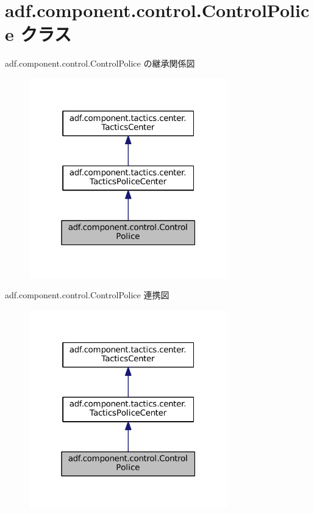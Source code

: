 \hypertarget{classadf_1_1component_1_1control_1_1ControlPolice}{}\section{adf.\+component.\+control.\+Control\+Police クラス}
\label{classadf_1_1component_1_1control_1_1ControlPolice}


adf.\+component.\+control.\+Control\+Police の継承関係図
\nopagebreak
\begin{figure}[H]
\begin{center}
\leavevmode
\includegraphics[width=244pt]{classadf_1_1component_1_1control_1_1ControlPolice__inherit__graph}
\end{center}
\end{figure}


adf.\+component.\+control.\+Control\+Police 連携図
\nopagebreak
\begin{figure}[H]
\begin{center}
\leavevmode
\includegraphics[width=244pt]{classadf_1_1component_1_1control_1_1ControlPolice__coll__graph}
\end{center}
\end{figure}
